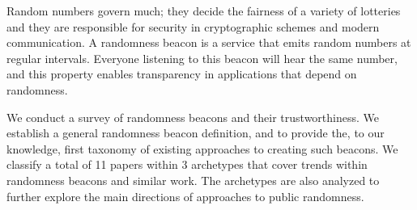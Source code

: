 Random numbers govern much;  they decide the fairness of a variety of lotteries and they are responsible for security in cryptographic schemes and modern communication. A randomness beacon is a service that emits random numbers at regular intervals. Everyone listening to this beacon will hear the same number, and this property enables transparency in applications that depend on randomness.%

We conduct a survey of randomness beacons and their trustworthiness. We establish a general randomness beacon definition, and to provide the, to our knowledge, first taxonomy of existing approaches to creating such beacons. We classify a total of 11 papers within 3 archetypes that cover trends within randomness beacons and similar work. The archetypes are also analyzed to further explore the main directions of approaches to public randomness. 
